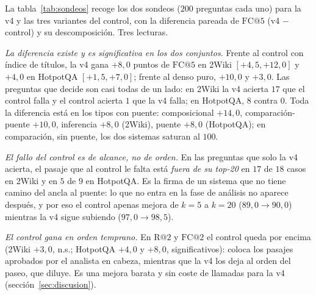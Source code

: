 \documentclass[11pt,a4paper]{article}
\begin{document}
La tabla~\ref{tab:sondeos} recoge los dos sondeos ($200$ preguntas cada
uno) para la v4 y las tres variantes del control, con la diferencia pareada
de $\mathrm{FC@}5$ (v4 $-$ control) y su descomposición. Tres lecturas.

\emph{La diferencia existe y es significativa en los dos conjuntos.} Frente
al control con índice de títulos, la v4 gana $+8{,}0$ puntos de
$\mathrm{FC@}5$ en 2Wiki $[+4{,}5,+12{,}0]$ y $+4{,}0$ en HotpotQA
$[+1{,}5,+7{,}0]$; frente al denso puro, $+10{,}0$ y $+3{,}0$. Las preguntas
que decide son casi todas de un lado: en 2Wiki la v4 acierta $17$ que el
control falla y el control acierta $1$ que la v4 falla; en HotpotQA, $8$
contra $0$. Toda la diferencia está en los tipos con puente: composicional
$+14{,}0$, comparación-puente $+10{,}0$, inferencia $+8{,}0$ (2Wiki),
puente $+8{,}0$ (HotpotQA); en comparación, sin puente, los dos sistemas
saturan al $100$.

\emph{El fallo del control es de alcance, no de orden.} En las preguntas que
solo la v4 acierta, el pasaje que al control le falta está \emph{fuera de
su top-20} en $17$ de $18$ casos en 2Wiki y en $5$ de $9$ en HotpotQA. Es
la firma de un sistema que no tiene camino del ancla al puente: lo que no
entra en la fase de análisis no aparece después, y por eso el control
apenas mejora de $k{=}5$ a $k{=}20$ ($89{,}0 \to 90{,}0$) mientras la v4
sigue subiendo ($97{,}0 \to 98{,}5$).

\emph{El control gana en orden temprano.} En $\mathrm{R@}2$ y
$\mathrm{FC@}2$ el control queda por encima (2Wiki $+3{,}0$, n.s.; HotpotQA
$+4{,}0$ y $+8{,}0$, significativos): coloca los pasajes aprobados por el
analista en cabeza, mientras que la v4 los deja al orden del paseo, que
diluye. Es una mejora barata y sin coste de llamadas para la v4
(sección~\ref{sec:discusion}).
\end{document}

